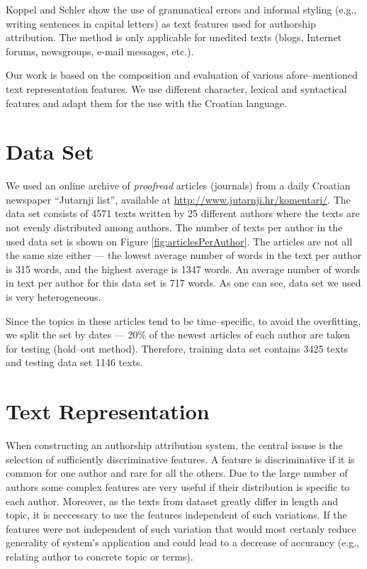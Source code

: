 \documentclass{llncs}
\begin{document}
Koppel and Schler \cite{koppel2003exploiting} show the use of grammatical
errors and informal styling (e.g., writing sentences in capital letters) as text features used for authorship attribution.
The method is only applicable for unedited texts (blogs, Internet forums,
newsgroups, e-mail messages, etc.).

Our work is based on the composition and evaluation of various
afore--mentioned text representation features. We use different
character, lexical and syntactical features and adapt them for the use with the
Croatian language.

\section{Data Set}
\label{sec:podatci}

We used an online archive of \emph{proofread} articles (journals) from a daily
Croatian newspaper ``Jutarnji list'', available at
\url{http://www.jutarnji.hr/komentari/}. The data set consists of 4571 texts
written by 25 different authors where the texts are not evenly distributed
among authors. The number of texts per author in the used data set is shown on
Figure \ref{fig:articlesPerAuthor}. The articles are not all the same size
either --- the lowest average number of words in the text per author is 315 words, and
the highest average is 1347 words. An average number of words in text per author for
this data set is 717 words. As one can see, data set we used is very
heterogeneous.

Since the topics in these articles tend to be time--specific, to avoid the
overfitting, we split the set by dates --- 20\% of the newest articles of each author are
taken for testing (hold--out method). Therefore, training data set contains 3425 texts
and testing data set 1146 texts.

\begin{minipage}{0.8\linewidth}
\vspace{10pt}
\centerline{\resizebox{0.7\linewidth}{!}{}}%
%
\label{fig:articlesPerAuthor}
\end{minipage}

\section{Text Representation}
When constructing an authorship attribution system, the central issuse is the
selection of sufficiently discriminative features. A feature is discriminative if
it is common for one author and rare for all the others. Due to the large number
of authors some complex features are very useful if their distribution is
specific to each author. Moreover, as the texts from dataset greatly differ in
length and topic, it is neccessary to use the features independent of such
variations. If the features were not independent of such variation that
would most certanly reduce generality of system's application and could lead
to a decrease of accurancy (e.g., relating author to concrete topic or terms).
\end{document}
